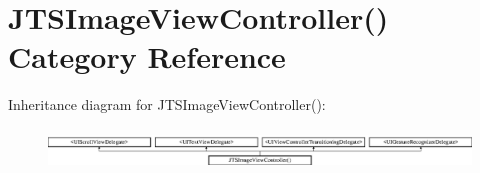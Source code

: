 \hypertarget{category_j_t_s_image_view_controller_07_08}{}\section{J\+T\+S\+Image\+View\+Controller() Category Reference}
\label{category_j_t_s_image_view_controller_07_08}
Inheritance diagram for J\+T\+S\+Image\+View\+Controller()\+:\begin{figure}[H]
\begin{center}
\leavevmode
\includegraphics[height=1.115538cm]{category_j_t_s_image_view_controller_07_08}
\end{center}
\end{figure}
